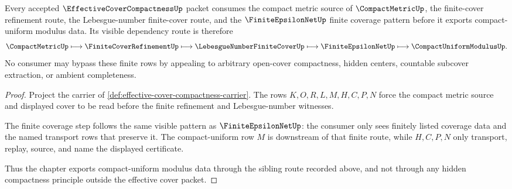\begin{theorem}
\label{thm:effective-cover-compactness-sibling-route}
Every accepted $\EffectiveCoverCompactnessUp$ packet consumes the compact metric source of $\CompactMetricUp$, the finite-cover refinement route, the Lebesgue-number finite-cover route, and the $\FiniteEpsilonNetUp$ finite coverage pattern before it exports compact-uniform modulus data. Its visible dependency route is therefore
$$
\CompactMetricUp \longmapsto \FiniteCoverRefinementUp \longmapsto \LebesgueNumberFiniteCoverUp \longmapsto \FiniteEpsilonNetUp \longmapsto \CompactUniformModulusUp .
$$
No consumer may bypass these finite rows by appealing to arbitrary open-cover compactness, hidden centers, countable subcover extraction, or ambient completeness.
\end{theorem}
\begin{proof}
Project the carrier of \autoref{def:effective-cover-compactness-carrier}. The rows $K,O,R,L,M,H,C,P,N$ force the compact metric source and displayed cover to be read before the finite refinement and Lebesgue-number witnesses.

The finite coverage step follows the same visible pattern as $\FiniteEpsilonNetUp$: the consumer only sees finitely listed coverage data and the named transport rows that preserve it. The compact-uniform row $M$ is downstream of that finite route, while $H,C,P,N$ only transport, replay, source, and name the displayed certificate.

Thus the chapter exports compact-uniform modulus data through the sibling route recorded above, and not through any hidden compactness principle outside the effective cover packet.
\end{proof}
